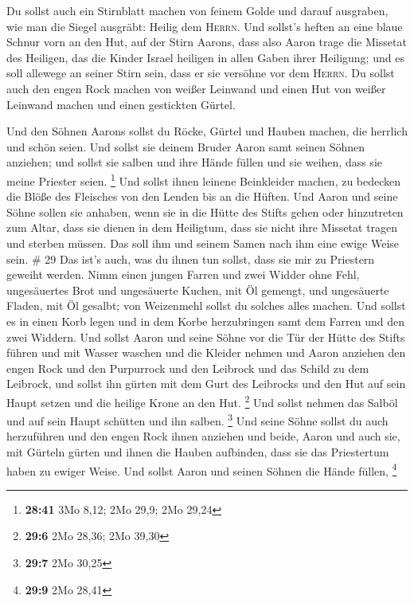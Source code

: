 Du sollst auch ein Stirnblatt machen von feinem Golde
und darauf ausgraben, wie man die Siegel ausgräbt: Heilig dem
\textsc{Herrn}.  Und sollst's heften an eine blaue Schnur
vorn an den Hut,  auf der Stirn Aarons, dass also Aaron
trage die Missetat des Heiligen, das die Kinder Israel heiligen in allen
Gaben ihrer Heiligung; und es soll allewege an seiner Stirn sein, dass
er sie versöhne vor dem \textsc{Herrn}.  Du sollst auch
den engen Rock machen von weißer Leinwand und einen Hut von weißer
Leinwand machen und einen gestickten Gürtel.

 Und den Söhnen Aarons sollst du Röcke, Gürtel und Hauben
machen, die herrlich und schön seien.  Und sollst sie
deinem Bruder Aaron samt seinen Söhnen anziehen; und sollst sie salben
und ihre Hände füllen und sie weihen, dass sie meine Priester seien.
\footnote{\textbf{28:41} 3Mo 8,12; 2Mo 29,9; 2Mo 29,24} 
Und sollst ihnen leinene Beinkleider machen, zu bedecken die Blöße des
Fleisches von den Lenden bis an die Hüften.  Und Aaron
und seine Söhne sollen sie anhaben, wenn sie in die Hütte des Stifts
gehen oder hinzutreten zum Altar, dass sie dienen in dem Heiligtum, dass
sie nicht ihre Missetat tragen und sterben müssen. Das soll ihm und
seinem Samen nach ihm eine ewige Weise sein. \# 29  Das
ist's auch, was du ihnen tun sollst, dass sie mir zu Priestern geweiht
werden. Nimm einen jungen Farren und zwei Widder ohne Fehl,
 ungesäuertes Brot und ungesäuerte Kuchen, mit Öl gemengt,
und ungesäuerte Fladen, mit Öl gesalbt; von Weizenmehl sollst du solches
alles machen.  Und sollst es in einen Korb legen und in
dem Korbe herzubringen samt dem Farren und den zwei Widdern.
 Und sollst Aaron und seine Söhne vor die Tür der Hütte
des Stifts führen und mit Wasser waschen  und die Kleider
nehmen und Aaron anziehen den engen Rock und den Purpurrock und den
Leibrock und das Schild zu dem Leibrock, und sollst ihn gürten mit dem
Gurt des Leibrocks  und den Hut auf sein Haupt setzen und
die heilige Krone an den Hut. \footnote{\textbf{29:6} 2Mo 28,36; 2Mo
  39,30}  Und sollst nehmen das Salböl und auf sein Haupt
schütten und ihn salben. \footnote{\textbf{29:7} 2Mo 30,25}
 Und seine Söhne sollst du auch herzuführen und den engen
Rock ihnen anziehen  und beide, Aaron und auch sie, mit
Gürteln gürten und ihnen die Hauben aufbinden, dass sie das Priestertum
haben zu ewiger Weise. Und sollst Aaron und seinen Söhnen die Hände
füllen, \footnote{\textbf{29:9} 2Mo 28,41}

